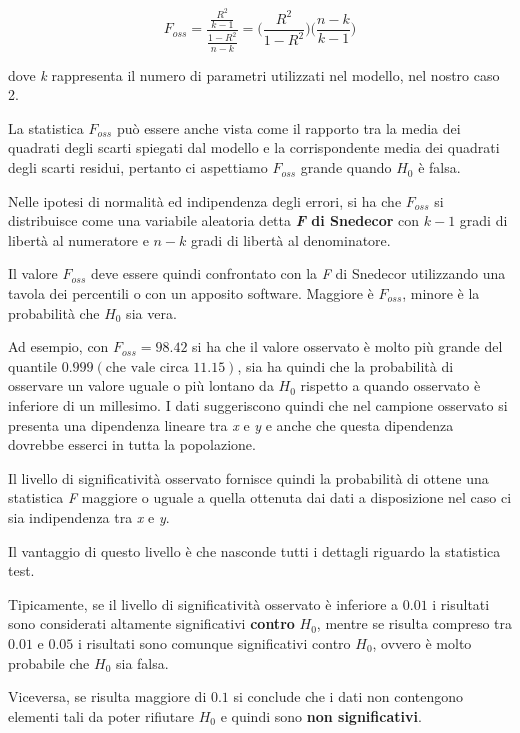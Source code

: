 $$
F_{oss} = \frac{\frac{R^2}{k -1}}{\frac{1-R^2}{n-k}} = \Bigg( \frac{R^2}{1-R^2} \Bigg) \Bigg( \frac{n-k}{k-1}\Bigg)
$$

dove \textit{k} rappresenta il numero di parametri utilizzati nel modello, nel nostro caso 2.

La statistica $ F_{oss}  $ può essere anche vista come il rapporto tra la media dei quadrati degli scarti spiegati dal modello e la corrispondente media dei quadrati degli scarti residui, pertanto ci aspettiamo $ F_{oss}  $ grande quando $ H_0 $ è falsa.

Nelle ipotesi di normalità ed indipendenza degli errori, si ha che $ F_{oss} $ si distribuisce come una variabile aleatoria detta \textbf{\textit{F} di Snedecor} con $ k-1 $ gradi di libertà al numeratore e $ n-k $ gradi di libertà al denominatore.

Il valore $ F_{oss} $ deve essere quindi confrontato con la \textit{F} di Snedecor utilizzando una tavola dei percentili o con un apposito software. Maggiore è $ F_{oss} $, minore è la probabilità che $ H_0 $ sia vera.

Ad esempio, con $ F_{oss}  = 98.42 $ si ha che il valore osservato è molto più grande del quantile $ 0.999 (\text{che vale circa } 11.15)$, sia ha quindi che la probabilità di osservare un valore uguale o più lontano da $ H_0 $ rispetto a quando osservato è inferiore di un millesimo.
I dati suggeriscono quindi che nel campione osservato si presenta una dipendenza lineare tra \textit{x} e \textit{y} e anche che questa dipendenza dovrebbe esserci in tutta la popolazione.

Il livello di significatività osservato fornisce quindi la probabilità di ottene una statistica \textit{F} maggiore o uguale a quella ottenuta dai dati a disposizione nel caso ci sia indipendenza tra \textit{x} e \textit{y}.

Il vantaggio di questo livello è che nasconde tutti i dettagli riguardo la statistica test.

Tipicamente, se il livello di significatività osservato è inferiore a $ 0.01 $ i risultati sono considerati altamente significativi \textbf{contro} $ H_0 $, mentre se risulta compreso tra $ 0.01 $ e $ 0.05 $ i risultati sono comunque significativi contro $ H_0 $, ovvero è molto probabile che $ H_0 $ sia falsa.

Viceversa, se risulta maggiore di $ 0.1 $ si conclude che i dati non contengono elementi tali da poter rifiutare $ H_0 $ e quindi sono \textbf{non significativi}.


